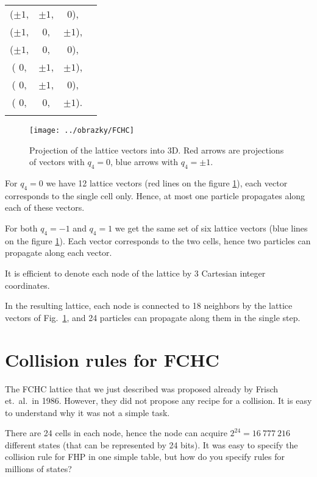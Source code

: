 \begin{tabular}{cccc}
\\
($\pm 1$,& $\pm 1$,& $0$),\\
($\pm 1$,& $0$,& $\pm 1$),\\
($\pm 1$,& $0$,& $0$),\\
( $0$,& $\pm 1$,& $\pm 1$),\\
( $0$,& $\pm 1$,& $0$),\\
( $0$,& $0$,& $\pm 1$).\\
\\
\end{tabular}

\begin{figure}
 \centering
 \texttt{[image: ../obrazky/FCHC]}
 \label{fchc}
 \caption{Projection of the lattice vectors into 3D. Red arrows are projections of vectors with $q_4 = 0$,
 blue arrows with $q_4 = \pm 1$.}
\end{figure}

For $q_4 = 0$ we have 12 lattice vectors (red lines on the figure \ref{fchc}), each vector corresponds to the single cell only. Hence, at most one particle propagates along each of these vectors.

For both $q_4 = -1$ and $q_4 = 1$ we get the same set of six lattice vectors (blue lines on the figure \ref{fchc}). Each vector corresponds to the two cells, hence two particles can propagate along each vector.


It is efficient to denote each node of the lattice by 3 Cartesian integer coordinates.


In the resulting lattice, each node is connected to 18 neighbors by the lattice vectors of Fig.\ \ref{fchc}, and 24 particles can propagate along them in the single step.

\section{Collision rules for FCHC}

The FCHC lattice that we just described was proposed already by Frisch et.\ al.\ in 1986.
However, they did not propose any recipe for a collision. It is easy to understand why it was not a simple task.

There are 24 cells in each node, hence the node can acquire $2^{24} = 16~777~216$ different states (that can be represented by 24 bits). It was easy to specify the collision rule for FHP in one simple table, but how do you specify rules for millions of states?


